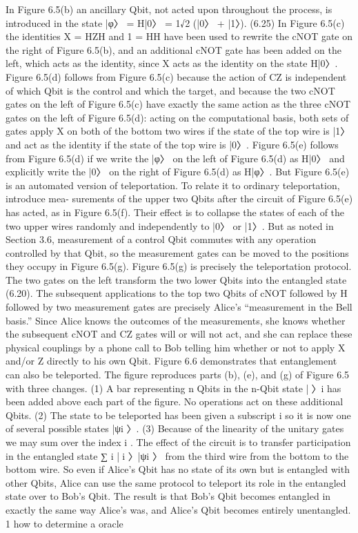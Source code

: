 \documentclass{book}
\begin{document}
In Figure 6.5(b) an ancillary Qbit, not acted upon throughout the process, is introduced in the state |φ〉 = H|0〉 = 1√2 (|0〉 + |1〉). (6.25) In Figure 6.5(c) the identities X = HZH and 1 = HH have been used to rewrite the cNOT gate on the right of Figure 6.5(b), and an additional cNOT gate has been added on the left, which acts as the identity, since X acts as the identity on the state H|0〉. Figure 6.5(d) follows from Figure 6.5(c) because the action of CZ is independent of which Qbit is the control and which the target, and because the two cNOT gates on the left of Figure 6.5(c) have exactly the same action as the three cNOT gates on the left of Figure 6.5(d): acting on the computational basis, both sets of gates apply X on both of the bottom two wires if the state of the top wire is |1〉 and act as the identity if the state of the top wire is |0〉. Figure 6.5(e) follows from Figure 6.5(d) if we write the |φ〉 on the left of Figure 6.5(d) as H|0〉 and explicitly write the |0〉 on the right of Figure 6.5(d) as H|φ〉. But Figure 6.5(e) is an automated version of teleportation. To relate it to ordinary teleportation, introduce mea- surements of the upper two Qbits after the circuit of Figure 6.5(e) has acted, as in Figure 6.5(f). Their effect is to collapse the states of each of the two upper wires randomly and independently to |0〉 or |1〉. But as noted in Section 3.6, measurement of a control Qbit commutes with any operation controlled by that Qbit, so the measurement gates can be moved to the positions they occupy in Figure 6.5(g). Figure 6.5(g) is precisely the teleportation protocol. The two gates on the left transform the two lower Qbits into the entangled state (6.20). The subsequent applications to the top two Qbits of cNOT followed by H followed by two measurement gates are precisely Alice’s “measurement in the Bell basis.” Since Alice knows the outcomes of the measurements, she knows whether the subsequent cNOT and CZ gates will or will not act, and she can replace these physical couplings by a phone call to Bob telling him whether or not to apply X and/or Z directly to his own Qbit. Figure 6.6 demonstrates that entanglement can also be teleported. The figure reproduces parts (b), (e), and (g) of Figure 6.5 with three changes. (1) A bar representing n Qbits in the n-Qbit state |〉i has been added above each part of the figure. No operations act on these additional Qbits. (2) The state to be teleported has been given a subscript i so it is now one of several possible states |ψi 〉. (3) Because of the linearity of the unitary gates we may sum over the index i . The effect of the circuit is to transfer participation in the entangled state ∑ i |i 〉|ψi 〉 from the third wire from the bottom to the bottom wire. So even if Alice’s Qbit has no state of its own but is entangled with other Qbits, Alice can use the same protocol to teleport its role in the entangled state over to Bob’s Qbit. The result is that Bob’s Qbit becomes entangled in exactly the same way Alice’s was, and Alice’s Qbit becomes entirely unentangled.
1
\newpage
how to determine a oracle\\
	
	
	
	
	
	
	
\end{document}
